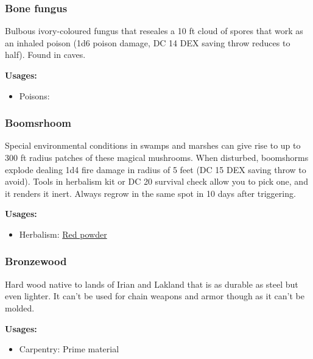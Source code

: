 \subsubsection{Bone fungus}
\label{Bone fungus}

Bulbous ivory-coloured fungus that reseales a 10 ft cloud of spores that work as an inhaled poison (1d6 poison damage, DC 14 DEX saving throw reduces to half). Found in caves.

\vspace{5mm}

\textbf{Usages:}

\begin{itemize}[noitemsep]
\item[] Poisons: \poison
\end{itemize}

\subsubsection{Boomsrhoom}
\label{Boomsrhoom}

Special environmental conditions in swamps and marshes can give rise to up to 300 ft radius patches of these magical mushrooms. When disturbed, boomshorms explode dealing 1d4 fire damage in radius of 5 feet (DC 15 DEX saving throw to avoid). Tools in herbalism kit or DC 20 survival check allow you to pick one, and it renders it inert. Always regrow in the same spot in 10 days after triggering.

\vspace{5mm}

\textbf{Usages:}

\begin{itemize}[noitemsep]
\item[] Herbalism: \hyperref[Red powder]{Red powder}
\end{itemize}

\subsubsection{Bronzewood}
\label{Bronzewood}

Hard wood native to lands of Irian and Lakland that is as durable as steel but even lighter. It can't be used for chain weapons and armor though as it can't be molded.

\vspace{5mm}

\textbf{Usages:}

\begin{itemize}[noitemsep]
\item[] Carpentry: Prime material
\end{itemize}

